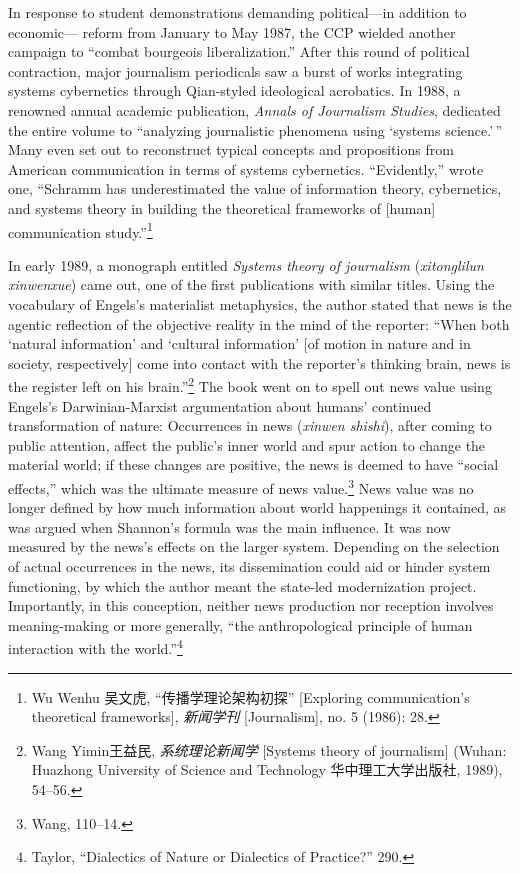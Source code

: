 \documentclass{tufte-handout}
\begin{document}
\begin{CJK*}{UTF8}{gbsn}
In response to student demonstrations demanding political---in addition
to economic--- reform from January to May 1987, the CCP wielded another
campaign to ``combat bourgeois liberalization.'' After this round of
political contraction, major journalism periodicals saw a burst of works
integrating systems cybernetics through Qian-styled ideological
acrobatics. In 1988, a renowned annual academic publication,
\emph{Annals of Journalism Studies}, dedicated the entire volume to
``analyzing journalistic phenomena using `systems science.'\,'' Many
even set out to reconstruct typical concepts and propositions from
American communication in terms of systems cybernetics. ``Evidently,''
wrote one, ``Schramm has underestimated the value of information theory,
cybernetics, and systems theory in building the theoretical frameworks
of {[}human{]} communication study.''\footnote{Wu Wenhu 吴文虎,
  ``传播学理论架构初探'' {[}Exploring communication's theoretical
  frameworks{]}, \emph{新闻学刊} {[}Journalism{]}, no. 5 (1986): 28.}

In early 1989, a monograph entitled \emph{Systems theory of journalism}
(\emph{xitonglilun xinwenxue}) came out, one of the first publications
with similar titles. Using the vocabulary of Engels's materialist
metaphysics, the author stated that news is the agentic reflection of
the objective reality in the mind of the reporter: ``When both `natural
information' and `cultural information' {[}of motion in nature and in
society, respectively{]} come into contact with the reporter's thinking
brain, news is the register left on his brain.''\footnote{Wang
  Yimin王益民, \emph{系统理论新闻学} {[}Systems theory of journalism{]}
  (Wuhan: Huazhong University of Science and Technology
  华中理工大学出版社, 1989), 54--56.} The book went on to spell out news
value using Engels's Darwinian-Marxist argumentation about humans'
continued transformation of nature: Occurrences in news (\emph{xinwen
shishi}), after coming to public attention, affect the public's inner
world and spur action to change the material world; if these changes are
positive, the news is deemed to have ``social effects,'' which was the
ultimate measure of news value.\footnote{Wang, 110--14.} News value was
no longer defined by how much information about world happenings it
contained, as was argued when Shannon's formula was the main influence.
It was now measured by the news's effects on the larger system.
Depending on the selection of actual occurrences in the news, its
dissemination could aid or hinder system functioning, by which the
author meant the state-led modernization project. Importantly, in this
conception, neither news production nor reception involves
meaning-making or more generally, ``the anthropological principle of
human interaction with the world.''\footnote{Taylor, ``Dialectics of
  Nature or Dialectics of Practice?'' 290.}


\end{CJK*}
\end{document}
